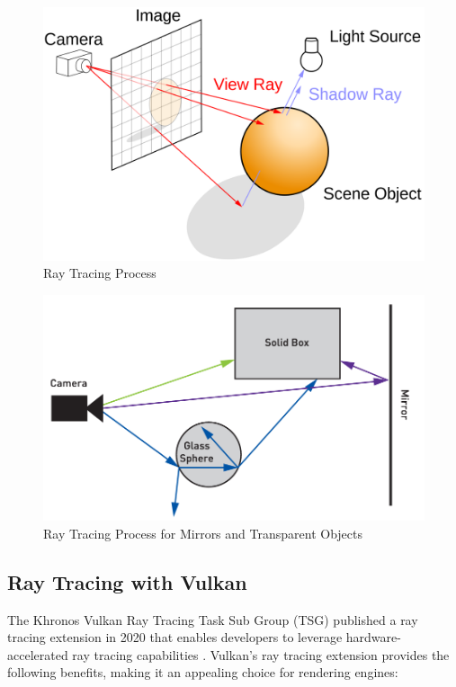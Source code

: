 \documentclass[conference]{IEEEtran}
\begin{document}
\begin{figure}[h]
    \centering
    \includegraphics[scale=0.2]{figures/Ray_tracing_process.png}
    \caption{Ray Tracing Process \cite{NVIDIA_ray_tracing}}
    \label{ray_tracing_process}
\end{figure}

\begin{figure}[h]
    \centering
    \includegraphics[scale=0.45]{figures/Ray_tracing_process_glass_mirror.png}
    \caption{Ray Tracing Process for Mirrors and Transparent Objects \cite{NVIDIA_ray_tracing}}
    \label{ray_tracing_process_glass_mirror}
\end{figure}

\subsection{Ray Tracing with Vulkan}
The Khronos Vulkan Ray Tracing Task Sub Group (TSG) published a ray tracing extension in 2020 that enables developers to leverage hardware-accelerated ray tracing capabilities \cite{KHR_Vulkan_Ray_Tracing}. Vulkan's ray tracing extension provides the following benefits, making it an appealing choice for rendering engines:
\end{document}
